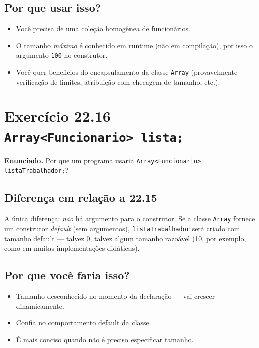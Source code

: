 \documentclass[11pt,a4paper]{article}
\begin{document}
\subsection*{Por que usar isso?}

\begin{itemize}[leftmargin=*,itemsep=0pt]
  \item Voc\^e precisa de uma cole\c{c}\~ao homog\^enea de funcion\'arios.
  \item O tamanho \emph{m\'aximo} \'e conhecido em runtime (n\~ao em compila\c{c}\~ao), por isso o argumento \texttt{100} no construtor.
  \item Voc\^e quer beneficios do encapsulamento da classe \texttt{Array} (provavelmente verifica\c{c}\~ao de limites, atribui\c{c}\~ao com checagem de tamanho, etc.).
\end{itemize}

\section{Exerc\'icio 22.16 --- \texttt{Array<Funcionario> lista;}}

\begin{enunciado}
\textbf{Enunciado.} Por que um programa usaria \texttt{Array<Funcionario> listaTrabalhador;}?
\end{enunciado}

\subsection*{Diferen\c{c}a em rela\c{c}\~ao a 22.15}

A \'unica diferen\c{c}a: \emph{n\~ao} h\'a argumento para o construtor. Se a classe \texttt{Array} fornece um construtor \emph{default} (sem argumentos), \texttt{listaTrabalhador} ser\'a criado com tamanho default --- talvez 0, talvez algum tamanho razo\'avel (10, por exemplo, como em muitas implementa\c{c}\~oes did\'aticas).

\subsection*{Por que voc\^e faria isso?}

\begin{itemize}[leftmargin=*,itemsep=0pt]
  \item Tamanho desconhecido no momento da declara\c{c}\~ao --- vai crescer dinamicamente.
  \item Confia no comportamento default da classe.
  \item \'E mais conciso quando n\~ao \'e preciso especificar tamanho.
\end{itemize}
\end{document}
